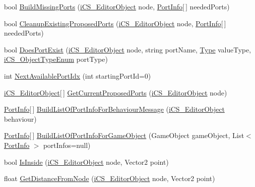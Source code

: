 \begin{DoxyCompactItemize}
\item 
bool \hyperlink{classi_c_s___i_storage_aaea1e532d29f17d0fd4e916a61258ab9}{Build\+Missing\+Ports} (\hyperlink{classi_c_s___editor_object}{i\+C\+S\+\_\+\+Editor\+Object} node, \hyperlink{structi_c_s___i_storage_1_1_port_info}{Port\+Info}\mbox{[}$\,$\mbox{]} needed\+Ports)
\item 
bool \hyperlink{classi_c_s___i_storage_a56e3a9e9ac64e31af39502c20ba2f629}{Cleanup\+Existing\+Proposed\+Ports} (\hyperlink{classi_c_s___editor_object}{i\+C\+S\+\_\+\+Editor\+Object} node, \hyperlink{structi_c_s___i_storage_1_1_port_info}{Port\+Info}\mbox{[}$\,$\mbox{]} needed\+Ports)
\item 
bool \hyperlink{classi_c_s___i_storage_ab748b627bc2552dcf8c8369f7fba40f9}{Does\+Port\+Exist} (\hyperlink{classi_c_s___editor_object}{i\+C\+S\+\_\+\+Editor\+Object} node, string port\+Name, \hyperlink{i_c_s___object_type_enum_8cs_ae6c3dd6d8597380b56d94908eb431547aa1fa27779242b4902f7ae3bdd5c6d508}{Type} value\+Type, \hyperlink{i_c_s___object_type_enum_8cs_ae6c3dd6d8597380b56d94908eb431547}{i\+C\+S\+\_\+\+Object\+Type\+Enum} port\+Type)
\item 
int \hyperlink{classi_c_s___i_storage_ab4d4f05c774c67254cf2d5e5efe9b107}{Next\+Available\+Port\+Idx} (int starting\+Port\+Id=0)
\item 
\hyperlink{classi_c_s___editor_object}{i\+C\+S\+\_\+\+Editor\+Object}\mbox{[}$\,$\mbox{]} \hyperlink{classi_c_s___i_storage_a9f0bba198a915d6b8deff85365462aef}{Get\+Current\+Proposed\+Ports} (\hyperlink{classi_c_s___editor_object}{i\+C\+S\+\_\+\+Editor\+Object} node)
\item 
\hyperlink{structi_c_s___i_storage_1_1_port_info}{Port\+Info}\mbox{[}$\,$\mbox{]} \hyperlink{classi_c_s___i_storage_a2a616efd0c820f427846674e0b9f7d3e}{Build\+List\+Of\+Port\+Info\+For\+Behaviour\+Message} (\hyperlink{classi_c_s___editor_object}{i\+C\+S\+\_\+\+Editor\+Object} behaviour)
\item 
\hyperlink{structi_c_s___i_storage_1_1_port_info}{Port\+Info}\mbox{[}$\,$\mbox{]} \hyperlink{classi_c_s___i_storage_a3656b52e0f3acd51acc5ca5616c939ba}{Build\+List\+Of\+Port\+Info\+For\+Game\+Object} (Game\+Object game\+Object, List$<$ \hyperlink{structi_c_s___i_storage_1_1_port_info}{Port\+Info} $>$ port\+Infos=null)
\item 
bool \hyperlink{classi_c_s___i_storage_ae1032e2951ca8748299b8eaa2e54aa29}{Is\+Inside} (\hyperlink{classi_c_s___editor_object}{i\+C\+S\+\_\+\+Editor\+Object} node, Vector2 point)
\item 
float \hyperlink{classi_c_s___i_storage_a8fe132a8e5d4f5b53beb0e9b31aad77b}{Get\+Distance\+From\+Node} (\hyperlink{classi_c_s___editor_object}{i\+C\+S\+\_\+\+Editor\+Object} node, Vector2 point)

\end{DoxyCompactItemize}
